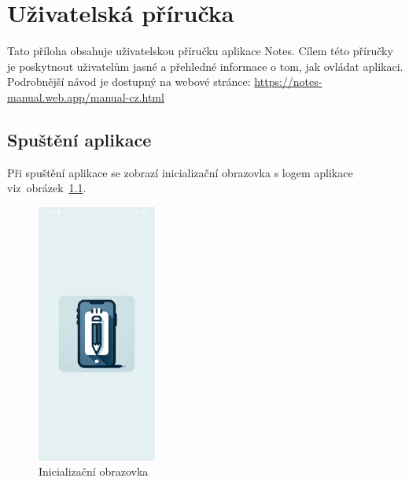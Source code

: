 \documentclass[czech, bc, kiv, he, iso690numb]{fasthesis}
\begin{document}
%
%
%
%
\appendix
%
%
%
%

\chapter{Uživatelská příručka}\label{app:user-manual}

Tato příloha obsahuje uživatelskou příručku aplikace Notes. Cílem této příručky je poskytnout uživatelům jasné a přehledné informace o tom, jak ovládat aplikaci. Podrobnější návod je dostupný na webové stránce: \url{https://notes-manual.web.app/manual-cz.html}

\section{Spuštění aplikace}

Při spuštění aplikace se zobrazí inicializační obrazovka s logem aplikace viz~obrázek~\ref{fig:SplashScreen}.

\begin{figure}[h!]
  \centering
  \includegraphics[width=0.35\textwidth]{img/BP-Runt/UserManual/SplashScreen.jpg}
  \caption{Inicializační obrazovka}
  \label{fig:SplashScreen}
\end{figure}
\end{document}
